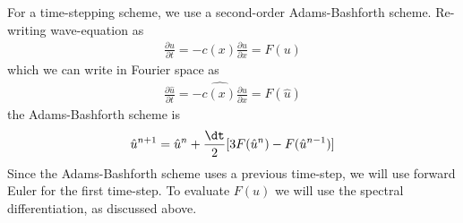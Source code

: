 For a time-stepping scheme, we use a second-order Adams-Bashforth\cite{durran} scheme. Re-writing wave-equation as
\begin{align}
\frac{\partial u}{\partial t} = -c(x)\frac{\partial u}{\partial x} = F(u)
\end{align}
which we can write in Fourier space as
\begin{align}
\frac{\partial \hat{u}}{\partial t} = \widehat{-c(x)\frac{\partial u}{\partial x}} = F(\hat{u})
\end{align}
the Adams-Bashforth scheme is
\begin{align}
\hat{u}^{n+1} = \hat{u}^{n} + \frac{\dt}{2}[3F(\hat{u}^{n})-F(\hat{u}^{n-1})]
\end{align}
Since the Adams-Bashforth scheme uses a previous time-step, we will use forward Euler for the first time-step. To evaluate $F(u)$ we will use the spectral differentiation, as discussed above. 

